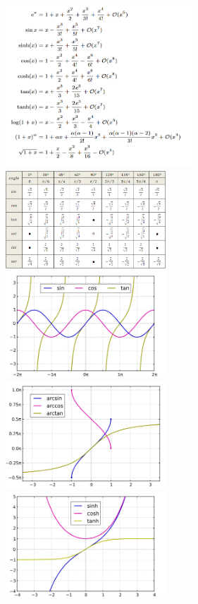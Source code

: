 \documentclass[8pt]{extarticle}
\begin{document}
\begin{multicols*}{3}
\begin{center}
\includegraphics[width=7cm]{taylor.png}\\
\includegraphics[width=6cm]{sincostantable.png}\\
\includegraphics[width=6cm]{sincostan.png}\\
\includegraphics[width=6cm]{arcsinArccosArctan.png}\\
\includegraphics[width=6cm]{sinhCoshTanh.png}


\end{center}
\end{multicols*}
\end{document}
